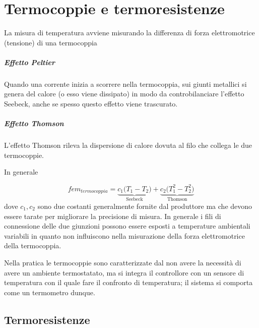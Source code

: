 \chapter{Termocoppie e termoresistenze}
	La misura di temperatura avviene misurando la differenza di forza elettromotrice (tensione) di una termocoppia
	
	\paragraph{Effetto Peltier} Quando una corrente inizia a scorrere nella termocoppia, sui giunti metallici si genera del calore (o esso viene dissipato) in modo da controbilanciare l'effetto Seebeck, anche se spesso questo effetto viene trascurato.
	
	\paragraph{Effetto Thomson} L'effetto Thomson rileva la dispersione di calore dovuta al filo che collega le due termocoppie.
	
	In generale
	
	\[ fem_{termocoppia} = \underbrace{c_1 \big(T_1-T_2\big)}_\textrm{Seebeck} +\underbrace{ c_2\big(T_1^2-T_2^2\big)}_\textrm{Thomson}\]
	dove $c_1,c_2$ sono due costanti generalmente fornite dal produttore ma che devono essere tarate per migliorare la precisione di misura. In generale i fili di connessione delle due giunzioni possono essere esposti a temperature ambientali variabili in quanto non influiscono nella misurazione della forza elettromotrice della termocoppia.
	
	Nella pratica le termocoppie sono caratterizzate dal non avere la necessità di avere un ambiente termostatato, ma si integra il controllore con un sensore di temperatura con il quale fare il confronto di temperatura; il sistema si comporta come un termometro dunque.
	
	
\section{Termoresistenze}
